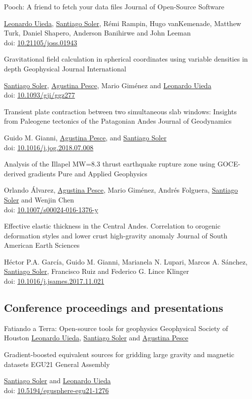 \documentclass[a4paper,12pt,sans,colorlinks]{moderncv/moderncv}
\newcommand{\me}{\href{https://www.santisoler.com}{Santiago Soler}}
\newcommand{\agustina}{\href{https://aguspesce.github.io}{Agustina Pesce}}
\newcommand{\guido}{Guido M. Gianni}
\newcommand{\leo}{\href{https://www.leouieda.com}{Leonardo Uieda}}
\newcommand{\mario}{Mario Giménez}
\newcommand{\remirampin}{Rémi Rampin}
\newcommand{\hugovankemenade}{Hugo vanKemenade}
\newcommand{\matthewturk}{Matthew Turk}
\newcommand{\danshapero}{Daniel Shapero}
\newcommand{\andersonbanihirwe}{Anderson Banihirwe}
\newcommand{\johnleeman}{John Leeman}
\newcommand{\orlando}{Orlando Álvarez}
\newcommand{\folguera}{Andrés Folguera}
\newcommand{\wenjinchen}{Wenjin Chen}
\newcommand{\pichu}{Héctor P.A. García}
\newcommand{\mae}{Marianela N. Lupari}
\newcommand{\marcos}{Marcos A. Sánchez}
\newcommand{\paco}{Francisco Ruiz}
\newcommand{\fede}{Federico G. Lince Klinger}
\newcommand{\doi}[1]{%
    \href{https://doi.org/#1}{#1}
}
\begin{document}
{Pooch: A friend to fetch your data files}
{Journal of Open-Source Software}
{}
{}
{
    \leo{}, \me{}, \remirampin{}, \hugovankemenade{}, \matthewturk{},
    \danshapero{}, \andersonbanihirwe{} and \johnleeman{}
    \\
    doi: \doi{10.21105/joss.01943}
}

{
    Gravitational field calculation in spherical coordinates using variable
    densities in depth
}
{Geophysical Journal International}
{}
{}
{
    \me{}, \agustina{}, \mario{} and \leo{}
    \\
    doi: \doi{10.1093/gji/ggz277}
}

{
    Transient plate contraction between two simultaneous slab windows:
    Insights from Paleogene tectonics of the Patagonian Andes
}
{Journal of Geodynamics}
{}
{}
{
    \guido{}, \agustina{}, and \me{}
    \\
    doi: \doi{10.1016/j.jog.2018.07.008}
}

{
    Analysis of the Illapel MW=8.3 thrust earthquake rupture zone using
    GOCE-derived gradients
}
{Pure and Applied Geophysics}
{}
{}
{
    \orlando{}, \agustina{}, \mario{}, \folguera{}, \me{} and \wenjinchen{}
    \\
    doi: \doi{10.1007/s00024-016-1376-y}
}

{
    Effective elastic thickness in the Central Andes.
    Correlation to orogenic deformation styles and lower crust high-gravity
    anomaly
}
{Journal of South American Earth Sciences}
{}
{}
{
    \pichu{}, \guido{}, \mae{}, \marcos{}, \me{}, \paco{} and \fede{}
    \\
    doi: \doi{10.1016/j.jsames.2017.11.021}
}


\newpage
\subsection{Conference proceedings and presentations}

{Fatiando a Terra: Open-source tools for geophysics}
{Geophysical Society of Houston}
{}
{}
{\leo{}, \me{} and \agustina{}}

{
    Gradient-boosted equivalent sources for gridding large gravity and
    magnetic datasets
}
{EGU21 General Assembly}
{}
{}
{
    \me{} and \leo{}
    \\
    doi: \doi{10.5194/egusphere-egu21-1276}
}
\end{document}

